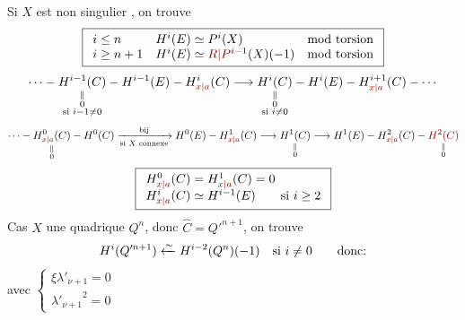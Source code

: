Si $X$ est non singulier , on trouve
\[
\boxed{\begin{array}{lll}
i\le n&H^i(E)\simeq P^i(X)&\text{mod torsion}\\
i\ge n+1&H^i(E)\simeq\unsure{R|P}^{i-1}(X)(-1)&\text{mod torsion}
\end{array}}
\]
\[
\cdots\mathbin{-}
\underset{\substack{\Vert\\0\\\text{si }i-1\ne0}}{H^{i-1}(C)}
\mathbin{-}H^{i-1}(E)\mathbin{-}H^i_{\unsure{x|a}}(C)
\longrightarrow
\underset{\substack{\Vert\\0\\\text{si }i\ne0}}{H^i(C)}
\mathbin{-}H^i(E)\mathbin{-}H^{i+1}_{\unsure{x|a}}(C)\mathbin{-}\cdots
\]
\[
\cdots\mathbin{-}\underset{\substack{\Vert\\0}}{H^0_{\unsure{x|a}}(C)}
\mathbin{-}H^0(C)
\xrightarrow[\uline{\text{si }X\text{ connexe}}]{\text{bij}}
H^0(E)\mathbin{-}H^1_{\unsure{x|a}}(C)
\longrightarrow\underset{\substack{\Vert\\0}}{H^1(C)}
\longrightarrow H^1(E)\mathbin{-}H^2_{\unsure{x|a}}(C)
\mathbin{-}\underset{\substack{\Vert\\0}}{\unsure{H^2(C)}}
\]
\[
\boxed{\begin{array}{l}
H^0_{\unsure{x|a}}(C)=H^1_{\unsure{x|a}}(C)=0\\
H^i_{\unsure{x|a}}(C)\simeq H^{i-1}(E)\qquad\text{si }i\ge2
\end{array}}
\]
Cas $X$ une quadrique $Q^n$, donc $\hat C=Q'^{n+1}$, on trouve
\[
H^i(Q'^{n+1})\xleftarrow{\sim}H^{i-2}(Q^n)(-1)
\quad\text{si }i\ne0\qquad\text{donc:}
\]
\diagram{\[
\left|\begin{array}{ll}
\left(1,\xi,\ldots,\xi^\nu,\frac12\xi^{\nu+1},\ldots,\frac12\xi^{2\nu}\right)
&\text{si }\boxed{n+1=2\nu}\\[6pt]
\left(1,\xi,\ldots,\xi^\nu,[\xi^{\nu+1},\lambda'_{\nu+1}],
\frac12\xi^{\nu+2},\ldots,\frac12\xi^{2\nu+1}\right)
&\text{si }\boxed{n+1=2\nu+1}
\end{array}\right.
\]}
avec $\left\{\begin{array}{l}\xi\lambda'_{\nu+1}=0\\{\lambda'_{\nu+1}}^2=0\end{array}\right.$

